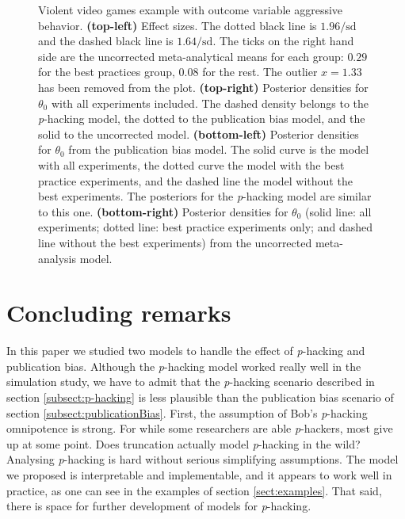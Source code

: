 \documentclass[useAMS,usenatbib,referee]{biom}
\begin{document}
\begin{figure}
\caption{\label{fig:anderson2010}Violent video games example with outcome variable aggressive behavior. \textbf{(top-left)} Effect sizes. The dotted black line is $1.96/\textrm{sd}$ and the dashed black line is $1.64/\textrm{sd}$. The ticks on the right hand side are the uncorrected meta-analytical means for each group: $0.29$ for the best practices group, $0.08$ for the rest. The outlier $x=1.33$ has been removed from the plot.
\textbf{(top-right)} Posterior densities for $\theta_{0}$ with all experiments included. The dashed density belongs to the \textit{p}-hacking model, the dotted to the publication bias model, and the solid to the uncorrected model. \textbf{(bottom-left)} Posterior densities for $\theta_{0}$ from the publication bias model. The solid curve is the model with all experiments, the dotted curve the model with the best practice experiments, and the dashed line the model without the best experiments. The posteriors for the \textit{p}-hacking model are similar to this one. \textbf{(bottom-right)} Posterior densities for $\theta_{0}$ (solid line: all experiments; dotted line: best practice experiments only; and dashed line without the best experiments) from the uncorrected meta-analysis model.}
\end{figure}

\section{Concluding remarks}\label{sect:conclusions}

In this paper we studied two models to handle the effect of \textit{p}-hacking and publication bias. Although the \textit{p}-hacking model worked really well in the simulation study, we have to admit that the \textit{p}-hacking scenario described in section \ref{subsect:p-hacking} is less plausible than the publication bias scenario of section \ref{subsect:publicationBias}. First, the assumption of Bob's \textit{p}-hacking omnipotence is strong. For while some researchers are able \textit{p}-hackers, most give up at some point. Does truncation actually model \textit{p}-hacking in the wild? Analysing \textit{p}-hacking is hard without serious simplifying assumptions. The model we proposed is interpretable and implementable, and it appears to work well in practice, as one can see in the examples of section \ref{sect:examples}. That said, there is space for further development of models for \textit{p}-hacking.
\end{document}
